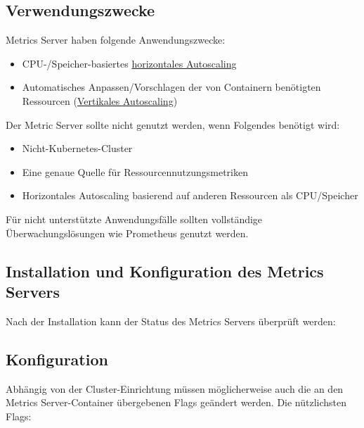 \subsection{Verwendungszwecke}

Metrics Server haben folgende Anwendungszwecke:

\begin{itemize}
    \item CPU-/Speicher-basiertes \href{https://kubernetes.io/docs/tasks/run-application/horizontal-pod-autoscale/}{horizontales Autoscaling}
    \item Automatisches Anpassen/Vorschlagen der von Containern benötigten Ressourcen (\href{https://kubernetes.io/docs/concepts/configuration/manage-resources-containers/#vertical-pod-autoscaling}{Vertikales Autoscaling})
\end{itemize}

Der Metric Server sollte nicht genutzt werden, wenn Folgendes benötigt wird:

\begin{itemize}
    \item Nicht-Kubernetes-Cluster
    \item Eine genaue Quelle für Ressourcennutzungsmetriken
    \item Horizontales Autoscaling basierend auf anderen Ressourcen als CPU/Speicher
\end{itemize}

Für nicht unterstützte Anwendungsfälle sollten vollständige Überwachungslösungen wie Prometheus genutzt werden.


\subsection{Installation und Konfiguration des Metrics Servers}


Nach der Installation kann der Status des Metrics Servers überprüft werden:

\newpage
\subsection{Konfiguration}

Abhängig von der Cluster-Einrichtung müssen möglicherweise auch die an den Metrics Server-Container übergebenen Flags geändert werden. Die nützlichsten Flags:

